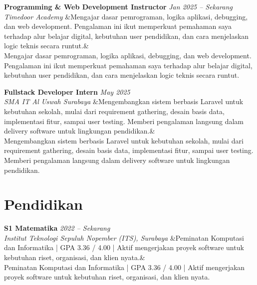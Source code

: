 \documentclass[a4paper,11pt]{article}
\newcommand{\cventry}[4]{%
  \noindent\textbf{#1} \hfill \textit{#3} \\
  \textit{#2}
  \ifx&#4& \else \\ \small #4 \fi
  \vspace{6pt}
}
\begin{document}
\cventry
  {Programming \& Web Development Instructor}
  {Timedoor Academy}
  {Jan 2025 -- Sekarang}
  {Mengajar dasar pemrograman, logika aplikasi, debugging, dan web development. Pengalaman ini ikut memperkuat pemahaman saya terhadap alur belajar digital, kebutuhan user pendidikan, dan cara menjelaskan logic teknis secara runtut.}

\cventry
  {Fullstack Developer Intern}
  {SMA IT Al Uswah Surabaya}
  {May 2025}
  {Mengembangkan sistem berbasis Laravel untuk kebutuhan sekolah, mulai dari requirement gathering, desain basis data, implementasi fitur, sampai user testing. Memberi pengalaman langsung dalam delivery software untuk lingkungan pendidikan.}

\section{Pendidikan}
\cventry
  {S1 Matematika}
  {Institut Teknologi Sepuluh Nopember (ITS), Surabaya}
  {2022 -- Sekarang}
  {Peminatan Komputasi dan Informatika | GPA 3.36 / 4.00 | Aktif mengerjakan proyek software untuk kebutuhan riset, organisasi, dan klien nyata.}
\end{document}
